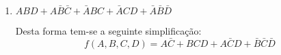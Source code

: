 \documentclass{article}
\begin{document}
\begin{resolution}
\begin{enumerate}[label=(\alph*), rightmargin = \leftmargin]
                    \item $ABD + A\bar{B}\bar{C} + \bar{A}BC + \bar{A}CD + \bar{A}\bar{B}\bar{D}$
                        \begin{figure}[H]
                            \centering
                            \begin{karnaugh-map}[4][4][1][$A\;B$][$C\;D$]
                            \end{karnaugh-map}
                        \end{figure}\noindent
                    Desta forma tem-se a seguinte simplificação:
                        \begin{equation}
                            \boxed{
                                f(A,B,C,D) = A\bar{C} + BCD + A\bar{C}D + \bar{B}\bar{C}\bar{D}
                            }
                        \end{equation}
\newpage


\end{enumerate}
\end{resolution}
\end{document}
